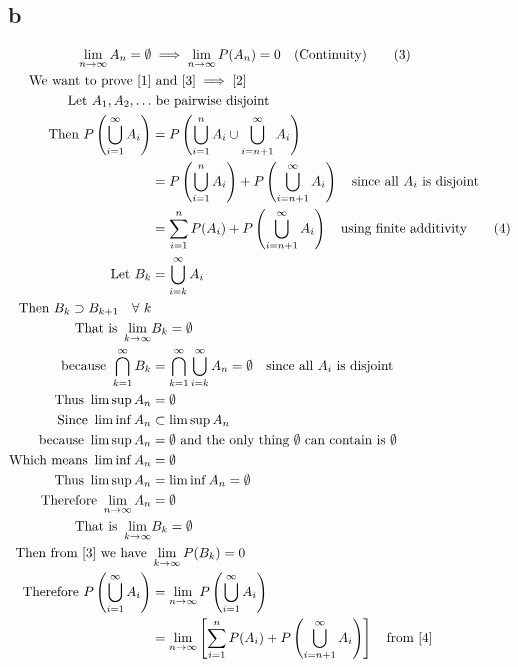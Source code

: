 \documentclass{article}
\begin{document}
\begin{flushleft}
\subsection*{b}
\begin{align*}
\lim_{n\to \infty} A_n= \emptyset &\implies \lim_{n\to \infty} P(A_n)=0 \quad \text{(Continuity)} \label{3} \tag{3}\\
\text{We want to prove } \eqref{1} &\text{ and } \eqref{3} \implies \eqref{2}\\
\text{Let } A_1,A_2,\dots &\text{ be pairwise disjoint}\\
\text{Then } P\left(\bigcup_{i=1}^{\infty}A_i \right)&=P\left(\bigcup_{i=1}^{n}A_i \cup \bigcup_{i=n+1}^{\infty}A_i \right)\\
&=P\left(\bigcup_{i=1}^{n}A_i \right)+P\left(\bigcup_{i=n+1}^{\infty}A_i \right) \quad \text{since all } A_i \text{ is disjoint}\\
&=\sum \limits_{i=1}^{n}P(A_i)+P\left(\bigcup_{i=n+1}^{\infty}A_i \right) \quad \text{using finite additivity} \label{4} \tag{4}\\
\text{Let } B_k &= \bigcup_{i=k}^{\infty}A_i\\
\text{Then }B_k \supset B_{k+1} \quad \forall \ k\\
\text{That is } \lim_{k\to \infty}& B_k= \emptyset\\
\text{because }\bigcap_{k=1}^{\infty}B_k&= \bigcap_{k=1}^{\infty}\bigcup_{i=k}^{\infty} A_n=\emptyset \quad \text{since all } A_i \text{ is disjoint}\\
\text{Thus } \limsup A_n &= \emptyset\\
\text{Since } \liminf A_n &\subset \limsup A_n\\
\text{because } \limsup A_n &= \emptyset \text{ and the only thing } \emptyset \text{ can contain is } \emptyset\\
\text{Which means }\liminf A_n &= \emptyset\\
\text{Thus } \limsup A_n&=\liminf A_n=\emptyset\\
\text{Therefore } \lim_{n \to \infty}A_n&=\emptyset\\
\text{That is } \lim_{k\to \infty}& B_k= \emptyset\\
\text{Then from } \eqref{3} \text{ we have } &\lim_{k\to \infty} P(B_k)=0\\
\text{Therefore }  P\left(\bigcup_{i=1}^{\infty}A_i \right)&=\lim_{n\to \infty} P\left(\bigcup_{i=1}^{\infty}A_i \right)\\
&=\lim_{n\to \infty}\left[\sum \limits_{i=1}^{n}P(A_i)+P\left(\bigcup_{i=n+1}^{\infty}A_i \right) \right] \quad \text{from } \eqref{4}\\

\end{align*}
\end{flushleft}
\end{document}

